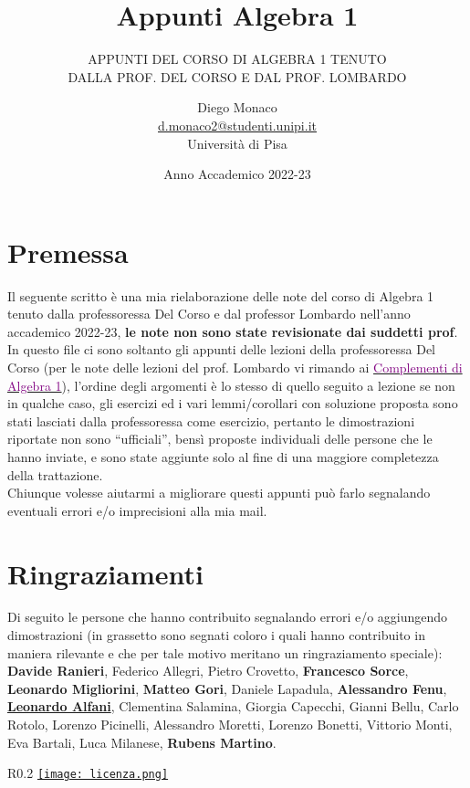 \documentclass[11pt]{scrartcl}
\begin{document}
\title{Appunti Algebra 1}
\subtitle{\large\normalfont\rmfamily\scshape APPUNTI DEL CORSO DI ALGEBRA 1 TENUTO\\ DALLA PROF. DEL CORSO E DAL PROF. LOMBARDO}
\author{Diego Monaco \\ \textnormal{\href{d.monaco2@studenti.unipi.it}{d.monaco2@studenti.unipi.it}} \\ Università di Pisa}
\date{Anno Accademico 2022-23}
\maketitle
\newpage

\tableofcontents
\eject
\newpage

\section*{Premessa}
Il seguente scritto è una mia rielaborazione delle note del corso di Algebra 1 tenuto dalla professoressa Del Corso e dal professor Lombardo nell'anno accademico 
2022-23, \textbf{le note non sono state revisionate dai suddetti prof}.\\ 
In questo file ci sono soltanto gli appunti delle lezioni della professoressa Del Corso (per
le note delle lezioni del prof. Lombardo vi rimando ai \href{https://github.com/diego-unipi/Algebra-1}{\textcolor{purple}{Complementi di Algebra 1}}), l'ordine degli argomenti è lo stesso di quello seguito a lezione se non 
in qualche caso, gli esercizi ed i vari lemmi/corollari con soluzione proposta sono stati lasciati dalla professoressa come esercizio, pertanto le dimostrazioni riportate non sono ``ufficiali'', bensì proposte individuali delle 
persone che le hanno inviate, e sono state aggiunte solo al fine di una maggiore completezza della trattazione.\\
Chiunque volesse aiutarmi a migliorare questi appunti può farlo segnalando eventuali errori e/o imprecisioni alla mia mail.


\section*{Ringraziamenti}
Di seguito le persone che hanno contribuito segnalando errori e/o aggiungendo dimostrazioni (in grassetto sono segnati coloro i quali hanno contribuito in maniera rilevante e che per tale motivo meritano un ringraziamento speciale):\\
\textbf{Davide Ranieri}, Federico Allegri, Pietro Crovetto, \textbf{Francesco Sorce}, \textbf{Leonardo Migliorini}, \textbf{Matteo Gori}, Daniele Lapadula, \textbf{Alessandro Fenu},
\underline{\textbf{Leonardo Alfani}}, Clementina Salamina, Giorgia Capecchi, Gianni Bellu, Carlo Rotolo, Lorenzo Picinelli, Alessandro Moretti, Lorenzo Bonetti, Vittorio Monti, Eva Bartali, Luca Milanese, \textbf{Rubens Martino}.
\mbox{}
\vfill
\begin{wrapfigure}{R}{0.2\textwidth}
	\centering
	\href{https://creativecommons.org/licenses/by-nc/4.0/deed.it}{\texttt{[image: licenza.png]}}
\end{wrapfigure}
\end{document}

